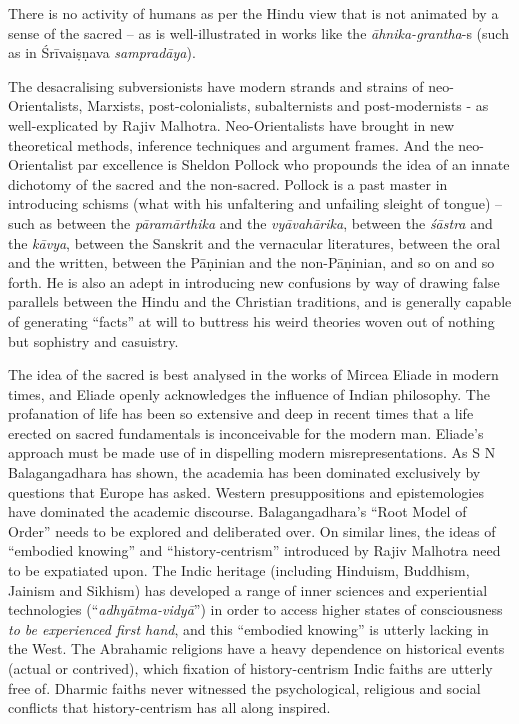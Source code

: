 There is no activity of humans as per the Hindu view that is not animated by a sense of the sacred – as is well-illustrated in works like the \textit{āhnika-grantha}-s (such as in Śrīvaiṣṇava \textit{sampradāya}).

The desacralising subversionists have modern strands and strains of neo-Orientalists, Marxists, post-colonialists, subalternists and post-modernists - as well-explicated by Rajiv Malhotra. Neo-Orientalists have brought in new theoretical methods, inference techniques and argument frames. And the neo-Orientalist par excellence is Sheldon Pollock who propounds the idea of an innate dichotomy of the sacred and the non-sacred. Pollock is a past master in introducing schisms (what with his unfaltering and unfailing sleight of tongue) – such as between the \textit{pāramārthika} and the \textit{vyāvahārika}, between the \textit{śāstra} and the \textit{kāvya}, between the Sanskrit and the vernacular literatures, between the oral and the written, between the Pāṇinian and the non-Pāṇinian, and so on and so forth. He is also an adept in introducing new confusions by way of drawing false parallels between the Hindu and the Christian traditions, and is generally capable of generating “facts” at will to buttress his weird theories woven out of nothing but sophistry and casuistry.

The idea of the sacred is best analysed in the works of Mircea Eliade in modern times, and Eliade openly acknowledges the influence of Indian philosophy. The profanation of life has been so extensive and deep in recent times that a life erected on sacred fundamentals is inconceivable for the modern man. Eliade’s approach must be made use of in dispelling modern misrepresentations. As S N Balagangadhara has shown, the academia has been dominated exclusively by questions that Europe has asked. Western presuppositions and epistemologies have dominated the academic discourse. Balagangadhara’s “Root Model of Order” needs to be explored and deliberated over. On similar lines, the ideas of “embodied knowing” and “history-centrism” introduced by Rajiv Malhotra need to be expatiated upon. The Indic heritage (including Hinduism, Buddhism, Jainism and Sikhism) has developed a range of inner sciences and experiential technologies (“\textit{adhyātma-vidyā}”) in order to access higher states of consciousness \textit{to be experienced first hand}, and this “embodied knowing” is utterly lacking in the West. The Abrahamic religions have a heavy dependence on historical events (actual or contrived), which fixation of history-centrism Indic faiths are utterly free of. Dharmic faiths never witnessed the psychological, religious and social conflicts that history-centrism has all along inspired.

